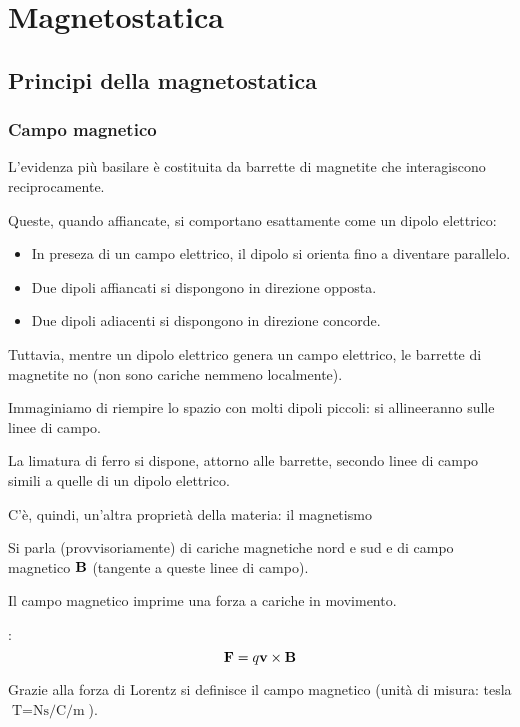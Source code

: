 \chapter{Magnetostatica}

\section{Principi della magnetostatica}

\subsection{Campo magnetico}

L'evidenza più basilare è costituita da barrette di magnetite che interagiscono reciprocamente.

Queste, quando affiancate, si comportano esattamente come un dipolo elettrico:
\begin{itemize}
    \item In preseza di un campo elettrico, il dipolo si orienta fino a diventare parallelo.
    \item Due dipoli affiancati si dispongono in direzione opposta.
    \item Due dipoli adiacenti si dispongono in direzione concorde.
\end{itemize}
Tuttavia, mentre un dipolo elettrico genera un campo elettrico, le barrette di magnetite no (non sono cariche nemmeno localmente).

Immaginiamo di riempire lo spazio con molti dipoli piccoli: si allineeranno sulle linee di campo.

La limatura di ferro si dispone, attorno alle barrette, secondo linee di campo simili a quelle di un dipolo elettrico.

C'è, quindi, un'altra proprietà della materia: il magnetismo

Si parla (provvisoriamente) di cariche magnetiche nord e sud e di campo magnetico $\mathbf{B}$ (tangente a queste linee di campo).

Il campo magnetico imprime una forza a cariche in movimento.

:
\begin{equation}
    \mathbf{F} = q \mathbf{v} \times \mathbf{B}
\end{equation}

Grazie alla forza di Lorentz si definisce il campo magnetico (unità di misura: tesla $\unit{\tesla} = \unit{\newton\second\per\coulomb\per\metre}$).

